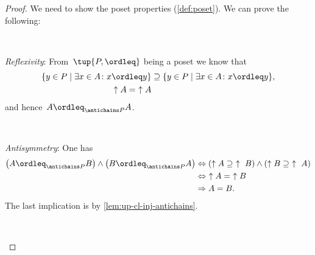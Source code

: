\begin{proof}
    We need to show the poset properties (\cref{def:poset}).
    We can prove the following:

    \

    \begin{compactitem}
        \item \emph{Reflexivity}: From~$\tup{P,\ordleq}$ being a poset we know that
        \begin{equation}
            \begin{aligned}
                \{y\in P \mid \exists x\in A \colon x\ordleq y\} &\supseteq \{y\in P \mid \exists x\in A \colon x\ordleq y\},\\
                \uparrow A =\ \uparrow A
            \end{aligned}
        \end{equation}
        and hence~$A\ordleq_{\antichains P}A$.

        \

        \item \emph{Antisymmetry}: One has
        \begin{equation}
            \begin{aligned}
                \left(A\ordleq_{\antichains P} B\right) \wedge \left(B\ordleq_{\antichains P} A\right)
                &\Leftrightarrow \left(\uparrow A \supseteq \ \uparrow \ B\right) \wedge \left( \uparrow  B\supseteq \ \uparrow \ A\right)\\
                &\Leftrightarrow \ \uparrow A= \ \uparrow B \\
                & \Rightarrow A = B.
            \end{aligned}
        \end{equation}
        The last implication is by  \cref{lem:up-cl-inj-antichains}.

        \



\end{compactitem}
\end{proof}
